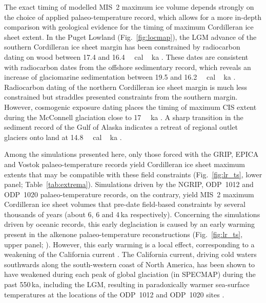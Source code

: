 \documentclass[tc, manuscript]{copernicus}
\begin{document}
The exact timing of modelled MIS~2 maximum ice volume depends strongly on the
choice of applied palaeo-temperature record, which allows for a more in-depth
comparison with geological evidence for the timing of maximum Cordilleran ice
sheet extent. In the Puget Lowland (Fig.~\ref{fig:locmap}), the LGM advance of
the southern Cordilleran ice sheet margin has been constrained by radiocarbon
dating on wood between 17.4 and 16.4\,\unit{\,cal\,ka}
\citep{Porter.Swanson.1998}. These dates are consistent with radiocarbon dates
from the offshore sedimentary record, which reveals
an increase of glaciomarine sedimentation between 19.5 and
16.2\,\unit{\,cal\,ka} \citep{Cosma.etal.2008, Taylor.etal.2014}.
Radiocarbon
dating of the northern Cordilleran ice sheet margin is much less constrained
but straddles presented constraints from the southern margin. However,
cosmogenic exposure dating places the timing of maximum CIS extent during the
McConnell glaciation close to 17\,\unit{\,ka}
\citep{Stroeven.etal.2010, Stroeven.etal.2014}. A sharp transition in
the sediment record of the Gulf of Alaska indicates a retreat of regional
outlet glaciers onto land at 14.8\,\unit{\,cal\,ka}
\citep{Davies.etal.2011}.

Among the simulations presented here, only those forced with the GRIP, EPICA
and Vostok palaeo-temperature records yield Cordilleran ice sheet maximum
extents that may be compatible with these field constraints
(Fig.~\ref{fig:lr_ts}, lower panel; Table~\ref{tab:extrema}).
Simulations driven by the NGRIP, ODP~1012 and ODP~1020
palaeo-temperature records, on the contrary, yield MIS~2 maximum Cordilleran
ice sheet volumes that pre-date field-based constraints by several thousands of
years (about 6, 6 and 4\,ka respectively).
Concerning the simulations driven by oceanic records, this early
deglaciation is caused by an early warming present in the alkenone
palaeo-temperature reconstructions (Fig.~\ref{fig:lr_ts}, upper panel;
\citealp[Fig.~3]{Herbert.etal.2001}). However, this
early warming is a local effect, corresponding to a weakening of the California
current \citep{Herbert.etal.2001}. The California current, driving cold
waters southwards along the south-western coast of North America, has been
shown to have weakened during each peak of global glaciation (in SPECMAP)
during the past 550\,ka, including the LGM, resulting in paradoxically warmer
sea-surface temperatures at the locations of the ODP~1012 and ODP~1020 sites
\citep{Herbert.etal.2001}.
\end{document}
